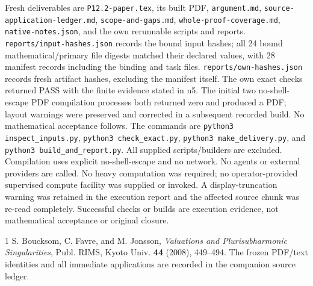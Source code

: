 \documentclass[11pt]{article}
\begin{document}
Fresh deliverables are \texttt{P12.\allowbreak{}2-\allowbreak{}paper.\allowbreak{}tex}, its built PDF, \texttt{argument.\allowbreak{}md}, \texttt{source-\allowbreak{}application-\allowbreak{}ledger.\allowbreak{}md}, \texttt{scope-\allowbreak{}and-\allowbreak{}gaps.\allowbreak{}md}, \texttt{whole-\allowbreak{}proof-\allowbreak{}coverage.\allowbreak{}md}, \texttt{native-\allowbreak{}notes.\allowbreak{}json}, and the own rerunnable scripts and reports. \texttt{reports/\allowbreak{}input-\allowbreak{}hashes.\allowbreak{}json} records the bound input hashes; all 24 bound mathematical/primary file digests matched their declared values, with 28 manifest records including the binding and task files. \texttt{reports/\allowbreak{}own-\allowbreak{}hashes.\allowbreak{}json} records fresh artifact hashes, excluding the manifest itself. The own exact checks returned PASS with the finite evidence stated in n5. The initial two no-shell-escape PDF compilation processes both returned zero and produced a PDF; layout warnings were preserved and corrected in a subsequent recorded build. No mathematical acceptance follows. The commands are \texttt{python3 inspect\_\allowbreak{}inputs.\allowbreak{}py}, \texttt{python3 check\_\allowbreak{}exact.\allowbreak{}py}, \texttt{python3 make\_\allowbreak{}delivery.\allowbreak{}py}, and \texttt{python3 build\_\allowbreak{}and\_\allowbreak{}report.\allowbreak{}py}. All supplied scripts/builders are excluded. Compilation uses explicit no-shell-escape and no network. No agents or external providers are called. No heavy computation was required; no operator-provided supervised compute facility was supplied or invoked. A display-truncation warning was retained in the execution report and the affected source chunk was re-read completely. Successful checks or builds are execution evidence, not mathematical acceptance or original closure.
\begin{thebibliography}{1}
 S. Boucksom, C. Favre, and M. Jonsson,
\emph{Valuations and Plurisubharmonic Singularities},
Publ. RIMS, Kyoto Univ. \textbf{44} (2008), 449--494.
The frozen PDF/text identities and all immediate applications are recorded in the companion source ledger.
\end{thebibliography}
\end{document}
